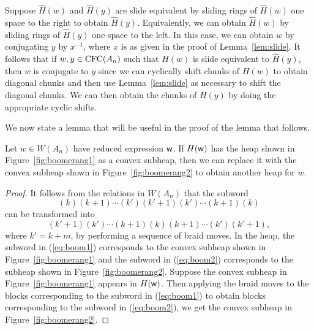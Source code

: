 \begin{remark}\label{rem:slide} Suppose $\hat{H}(w)$ and $\hat{H}(y)$ are slide equivalent by sliding rings of $\hat{H}(w)$ one space to the right to obtain $\hat{H}(y)$.
    Equivalently, we can obtain $\hat{H}(w)$ by sliding rings of $\hat{H}(y)$ one space to the left. In this case, we can obtain $w$ by conjugating $y$ by $x^{-1}$, where $x$ is as given in the proof of Lemma~\ref{lem:slide}.
    It follows that if $w,y \in \operatorname{\mathrm{CFC}}(A_n)$ such that $\hat{H}(w)$ is slide equivalent to $\hat{H}(y)$, then $w$ is conjugate to $y$ since we can cyclically shift chunks of $H(w)$ to obtain diagonal chunks and then use Lemma~\ref{lem:slide} as necessary to shift the diagonal chunks. We can then obtain the chunks of $H(y)$ by doing the appropriate cyclic shifts.
\end{remark}

\pagebreak
    We now state a lemma that will be useful in the proof of the lemma that follows.

\begin{lemma} \label{lem:boomerang} Let $w \in W(A_n)$ have reduced expression $\mathsf{w}$. If $H(\mathsf{w})$ has the heap shown in Figure~\ref{fig:boomerang1} as a convex subheap, then we can replace it with the convex subheap shown in Figure~\ref{fig:boomerang2} to obtain another heap for $w$.
\end{lemma}
\begin{proof} It follows from the relations in $W(A_n)$ that the subword \begin{equation} \label{eq:boom1} (k)(k+1) \cdots (k')(k'+1)(k') \cdots (k+1)(k) \end{equation} can be transformed into \begin{equation} \label{eq:boom2} (k'+1)(k') \cdots (k+1)(k)(k+1) \cdots (k')(k'+1), \end{equation} where $k'=k+m$, by performing a sequence of braid moves.
    In the heap, the subword in (\ref{eq:boom1}) corresponds to the convex subheap shown in Figure~\ref{fig:boomerang1} and the subword in (\ref{eq:boom2}) corresponds to the subheap shown in Figure~\ref{fig:boomerang2}.
    Suppose the convex subheap in Figure~\ref{fig:boomerang1} appears in $H(\mathsf{w})$. Then applying the braid moves to the blocks corresponding to the subword in (\ref{eq:boom1}) to obtain blocks corresponding to the subword in (\ref{eq:boom2}), we get the convex subheap in Figure~\ref{fig:boomerang2}.
\end{proof}

